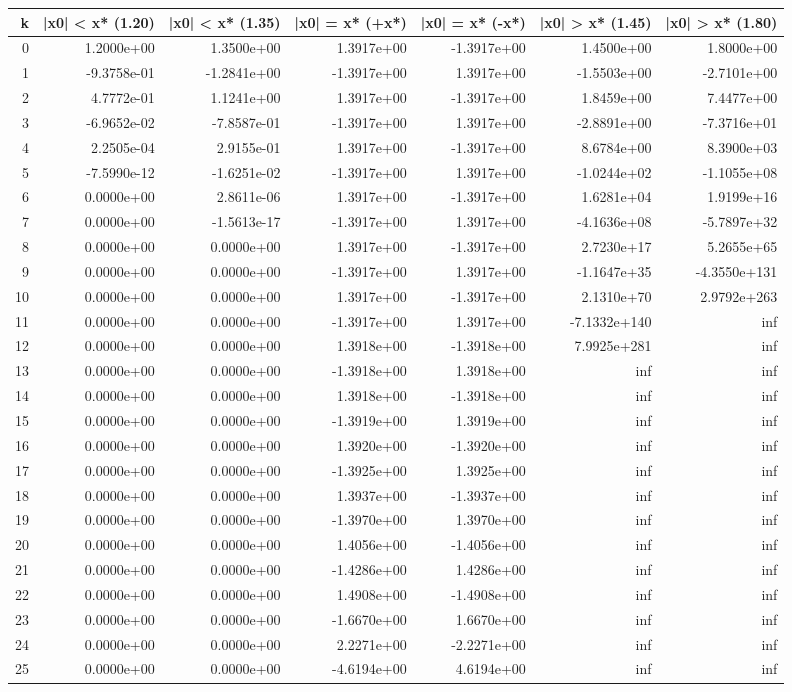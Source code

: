 \begin{tabular}{rrrrrrr}
\toprule
k & |x0| < x* (1.20) & |x0| < x* (1.35) & |x0| = x* (+x*) & |x0| = x* (-x*) & |x0| > x* (1.45) & |x0| > x* (1.80) \\
\midrule
0 & 1.2000e+00 & 1.3500e+00 & 1.3917e+00 & -1.3917e+00 & 1.4500e+00 & 1.8000e+00 \\
1 & -9.3758e-01 & -1.2841e+00 & -1.3917e+00 & 1.3917e+00 & -1.5503e+00 & -2.7101e+00 \\
2 & 4.7772e-01 & 1.1241e+00 & 1.3917e+00 & -1.3917e+00 & 1.8459e+00 & 7.4477e+00 \\
3 & -6.9652e-02 & -7.8587e-01 & -1.3917e+00 & 1.3917e+00 & -2.8891e+00 & -7.3716e+01 \\
4 & 2.2505e-04 & 2.9155e-01 & 1.3917e+00 & -1.3917e+00 & 8.6784e+00 & 8.3900e+03 \\
5 & -7.5990e-12 & -1.6251e-02 & -1.3917e+00 & 1.3917e+00 & -1.0244e+02 & -1.1055e+08 \\
6 & 0.0000e+00 & 2.8611e-06 & 1.3917e+00 & -1.3917e+00 & 1.6281e+04 & 1.9199e+16 \\
7 & 0.0000e+00 & -1.5613e-17 & -1.3917e+00 & 1.3917e+00 & -4.1636e+08 & -5.7897e+32 \\
8 & 0.0000e+00 & 0.0000e+00 & 1.3917e+00 & -1.3917e+00 & 2.7230e+17 & 5.2655e+65 \\
9 & 0.0000e+00 & 0.0000e+00 & -1.3917e+00 & 1.3917e+00 & -1.1647e+35 & -4.3550e+131 \\
10 & 0.0000e+00 & 0.0000e+00 & 1.3917e+00 & -1.3917e+00 & 2.1310e+70 & 2.9792e+263 \\
11 & 0.0000e+00 & 0.0000e+00 & -1.3917e+00 & 1.3917e+00 & -7.1332e+140 & inf \\
12 & 0.0000e+00 & 0.0000e+00 & 1.3918e+00 & -1.3918e+00 & 7.9925e+281 & inf \\
13 & 0.0000e+00 & 0.0000e+00 & -1.3918e+00 & 1.3918e+00 & inf & inf \\
14 & 0.0000e+00 & 0.0000e+00 & 1.3918e+00 & -1.3918e+00 & inf & inf \\
15 & 0.0000e+00 & 0.0000e+00 & -1.3919e+00 & 1.3919e+00 & inf & inf \\
16 & 0.0000e+00 & 0.0000e+00 & 1.3920e+00 & -1.3920e+00 & inf & inf \\
17 & 0.0000e+00 & 0.0000e+00 & -1.3925e+00 & 1.3925e+00 & inf & inf \\
18 & 0.0000e+00 & 0.0000e+00 & 1.3937e+00 & -1.3937e+00 & inf & inf \\
19 & 0.0000e+00 & 0.0000e+00 & -1.3970e+00 & 1.3970e+00 & inf & inf \\
20 & 0.0000e+00 & 0.0000e+00 & 1.4056e+00 & -1.4056e+00 & inf & inf \\
21 & 0.0000e+00 & 0.0000e+00 & -1.4286e+00 & 1.4286e+00 & inf & inf \\
22 & 0.0000e+00 & 0.0000e+00 & 1.4908e+00 & -1.4908e+00 & inf & inf \\
23 & 0.0000e+00 & 0.0000e+00 & -1.6670e+00 & 1.6670e+00 & inf & inf \\
24 & 0.0000e+00 & 0.0000e+00 & 2.2271e+00 & -2.2271e+00 & inf & inf \\
25 & 0.0000e+00 & 0.0000e+00 & -4.6194e+00 & 4.6194e+00 & inf & inf \\
\bottomrule
\end{tabular}
